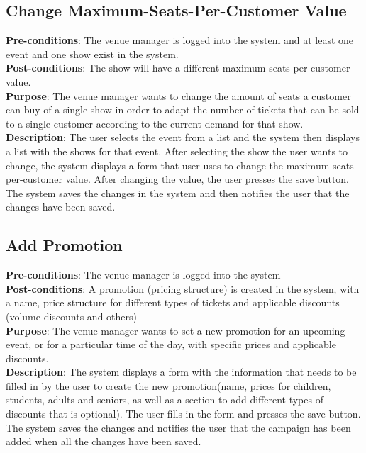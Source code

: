 \subsection{Change Maximum-Seats-Per-Customer Value}
\textbf{Pre-conditions}: The venue manager is logged into the system
and at least one event and one show exist in the system.\\

\textbf{Post-conditions}: The show will have a different
maximum-seats-per-customer value.\\

\textbf{Purpose}: The venue manager wants to change the amount of
seats a customer can buy of a single show in order to adapt the
number of tickets that can be sold to a single customer according
to the current demand for that show.\\

\textbf{Description}: The user selects the event from a list and the
system then displays a list with the shows for that event. After
selecting the show the user wants to change, the system displays a
form that user uses to change the maximum-seats-per-customer value.
After changing the value, the user presses the save button. The
system saves the changes in the system and then notifies the user
that the changes have been saved.

\subsection{Add Promotion}
\textbf{Pre-conditions}: The venue manager is logged into the system\\

\textbf{Post-conditions}: A promotion (pricing structure) is created
in the system, with a name, price structure for different types of
tickets and applicable discounts (volume discounts and others)\\

\textbf{Purpose}: The venue manager wants to set a new promotion for
an upcoming event, or for a particular time of the day, with specific
prices and applicable discounts.\\

\textbf{Description}: The system displays a form with the information
that needs to be filled in by the user to create the new promotion(name,
prices for children, students, adults and seniors, as well as a section
to add different types of discounts that is optional). The user fills in
the form and presses the save button. The system saves the changes and
notifies the user that the campaign has been added when all the changes
have been saved.

